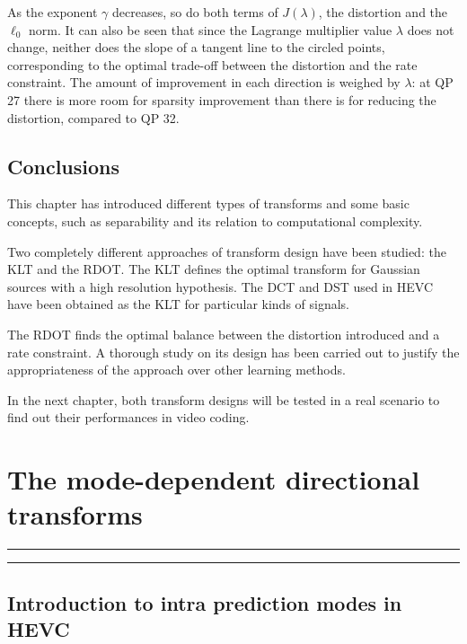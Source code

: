 \documentclass[11pt,a4paper,openright,twoside]{book}
\providecommand{\chaptertoc}{
	\startcontents[chapters]
	\hrule
	\vspace{1em}
	\printcontents[chapters]{}{1}{{\bf\large Contents}}
	\hrule
}
\numberwithin{equation}{section} %
\numberwithin{figure}{section} %
\numberwithin{table}{section} %
\begin{document}
As the exponent $\gamma$ decreases, so do both terms of $J(\lambda)$,
the distortion and the $\ell_0$ norm.
It can also be seen that since the Lagrange multiplier value $\lambda$
does not change, neither does the slope of a tangent line to the circled
points, corresponding to the optimal trade-off between the distortion
and the rate constraint.
The amount of improvement in each direction is weighed by $\lambda$: at
\ac{QP} 27 there is more room for sparsity improvement than there is for
reducing the distortion, compared to \ac{QP} 32.

\section{Conclusions}
\label{sec:conclusions_transforms}

This chapter has introduced different types of transforms and some
basic concepts, such as separability and its relation to computational
complexity.

Two completely different approaches of transform design have been
studied: the \ac{KLT} and the \ac{RDOT}.
The \ac{KLT} defines the optimal transform for Gaussian sources with a
high resolution hypothesis.
The \ac{DCT} and \ac{DST} used in \ac{HEVC} have been obtained as the
\ac{KLT} for particular kinds of signals.

The \ac{RDOT} finds the optimal balance between the distortion
introduced and a rate constraint.
A thorough study on its design has been carried out to justify the
appropriateness of the approach over other learning methods.

In the next chapter, both transform designs will be tested in a real
scenario to find out their performances in video coding.


\chapter{The mode-dependent directional transforms}
\label{cha:the_mode_dependent_directional_transforms}
\chaptertoc

\section{Introduction to intra prediction modes in \acs{HEVC}}
\label{sec:introduction_to_intra_prediction_modes_in_hevc}
\end{document}
